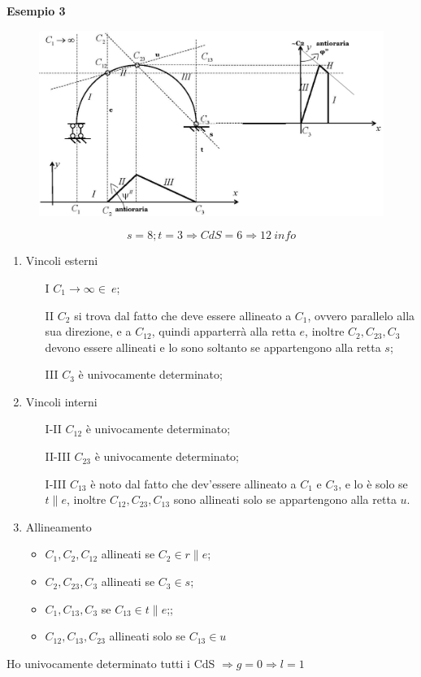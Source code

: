 \documentclass{article}
\begin{document}
\begin{adjustwidth}{2in}{}
\textbf{Esempio 3} \newline
\begin{figure}[H]
	\centering
	\includegraphics[width=0.65\linewidth]{immagini/1.PARTE3_Pagina_21}
\end{figure}
\[ s=8; t=3 \Rightarrow CdS = 6 \Rightarrow 12 ~ info\]
\begin{enumerate}
	\item Vincoli esterni 
	\begin{itemize}
		\item[I] $C_1 \rightarrow \infty \in ~  e$;
		\item[II] $C_2$ si trova dal fatto che deve essere allineato a $C_1$, ovvero parallelo alla sua direzione, e a $C_{12}$, quindi apparterrà alla retta $e$, inoltre $C_2, C_{23}, C_3$ devono essere allineati e lo sono soltanto se appartengono alla retta $s$;
		\item[III] $C_3$ è univocamente determinato;
	\end{itemize}
	
	\item Vincoli interni
	\begin{itemize}
		\item[I-II]  $C_{12}$ è univocamente determinato;
		\item[II-III] $C_{23}$ è univocamente determinato;
		\item[I-III] $C_{13}$ è noto dal fatto che dev'essere allineato a $C_1$ e $C_3$, e lo è solo se $t\parallel e$, inoltre $C_{12}, C_{23}, C_{13}$ sono allineati solo se appartengono alla retta $u$.
	\end{itemize}
	\item Allineamento
	\begin{itemize}
		\item $C_1, C_2, C_{12}$ allineati se $C_2 \in r \parallel e$;
		\item $C_2, C_{23}, C_3$ allineati se $C_3 \in s$;
		\item $C_1, C_{13}, C_3$ se $C_{13} \in t \parallel e$;;
		\item $C_{12}, C_{13}, C_{23}$ allineati solo se $C_{13} \in u$
	\end{itemize}	
\end{enumerate}
Ho univocamente determinato tutti i CdS $\Rightarrow g=0 \Rightarrow l=1$ \newline


\end{adjustwidth}
\end{document}
